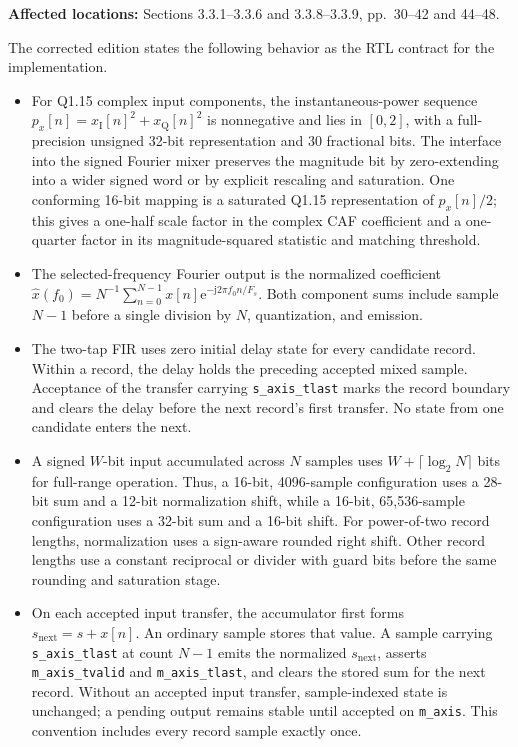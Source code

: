 \documentclass[12pt]{article}
\begin{document}
\noindent\textbf{Affected locations:} Sections 3.3.1--3.3.6 and 3.3.8--3.3.9, pp.~30--42 and 44--48.

The corrected edition states the following behavior as the RTL contract for the implementation.

\begin{itemize}
  \item For Q1.15 complex input components, the instantaneous-power sequence $p_x[n]=x_{\mathrm{I}}[n]^2+x_{\mathrm{Q}}[n]^2$ is nonnegative and lies in $[0,2]$, with a full-precision unsigned 32-bit representation and 30 fractional bits. The interface into the signed Fourier mixer preserves the magnitude bit by zero-extending into a wider signed word or by explicit rescaling and saturation. One conforming 16-bit mapping is a saturated Q1.15 representation of $p_x[n]/2$; this gives a one-half scale factor in the complex CAF coefficient and a one-quarter factor in its magnitude-squared statistic and matching threshold.

  \item The selected-frequency Fourier output is the normalized coefficient $\widehat{x}(f_0)=N^{-1}\sum_{n=0}^{N-1}x[n]\mathrm{e}^{-\mathrm{j}2\pi f_0n/F_s}$. Both component sums include sample $N-1$ before a single division by $N$, quantization, and emission.

  \item The two-tap FIR uses zero initial delay state for every candidate record. Within a record, the delay holds the preceding accepted mixed sample. Acceptance of the transfer carrying \texttt{s\_axis\_tlast} marks the record boundary and clears the delay before the next record's first transfer. No state from one candidate enters the next.

  \item A signed $W$-bit input accumulated across $N$ samples uses $W+\lceil\log_2N\rceil$ bits for full-range operation. Thus, a 16-bit, 4096-sample configuration uses a 28-bit sum and a 12-bit normalization shift, while a 16-bit, 65,536-sample configuration uses a 32-bit sum and a 16-bit shift. For power-of-two record lengths, normalization uses a sign-aware rounded right shift. Other record lengths use a constant reciprocal or divider with guard bits before the same rounding and saturation stage.

  \item On each accepted input transfer, the accumulator first forms $s_{\mathrm{next}}=s+x[n]$. An ordinary sample stores that value. A sample carrying \texttt{s\_axis\_tlast} at count $N-1$ emits the normalized $s_{\mathrm{next}}$, asserts \texttt{m\_axis\_tvalid} and \texttt{m\_axis\_tlast}, and clears the stored sum for the next record. Without an accepted input transfer, sample-indexed state is unchanged; a pending output remains stable until accepted on \texttt{m\_axis}. This convention includes every record sample exactly once.
\end{itemize}
\end{document}
